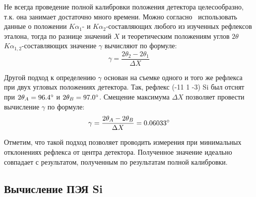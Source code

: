 Не всегда проведение полной калибровки положения детектора целесообразно, т.к. она занимает достаточно много времени.
Можно согласно~\cite{Gromilov:2022} использовать данные о положении $K\alpha_1$- и $K\alpha_2$-составляющих любого из изученных рефлексов эталона, тогда по разнице значений $X$ и теоретическим положениям углов $2\theta$  $K\alpha_{1,2}$-составляющих значение $\gamma$ вычисляют по формуле:
\begin{equation}\label{eq:pixsize_exp}
    \gamma = \frac{2\theta_2 - 2\theta_1}{\Delta X}
\end{equation}

Другой подход к определению $\gamma$ основан на съемке одного и того же рефлекса при двух угловых положениях детектора.
Так, рефлекс \hkl(-11 1 -3) Si был отснят при $2\theta_A = 96.4^\circ$ и $2\theta_B = 97.0^\circ$.
Смещение максимума $\Delta X$ позволяет провести вычисление $\gamma$ по формуле:
\begin{equation}\label{eq:pixsize_exp_2}
    \gamma = \frac{2\theta_A - 2\theta_B}{\Delta X} = 0.06033^\circ
\end{equation}

Отметим, что такой подход позволяет проводить измерения при минимальных отклонениях рефлекса от центра детектора.
Полученное значение идеально совпадает с результатом, полученным по результатам полной калибровки.

\subsection{Вычисление ПЭЯ Si}

